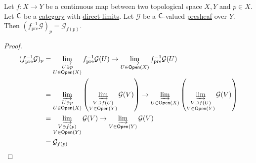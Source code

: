 \documentclass[../../../main]{subfiles}
\begin{document}
\begin{lemma}
  Let \(f: X \to Y\) be a continuous map between two topological space \(X, Y\) and \(p \in X\).
  Let \(\mathsf{C}\) be a \hyperref[def:category]{category} with \hyperref[def:direct-limit]{direct limits}.
  Let \(\mathcal{G}\) be a \(\mathsf{C}\)-valued \hyperref[def:presheaf]{presheaf} over \(Y\).
  Then \((f_{\operatorname{pre}}^{-1} \mathcal{G})_{p} = \mathcal{G}_{f(p)}\).
\end{lemma}
\begin{proof}
  \begin{align*}
    (f_{\operatorname{pre}}^{-1} \mathcal{G})_{p} &= \varinjlim_{\substack{U \ni p \\ U \in \mathsf{Open}(X)}} f_{\operatorname{pre}}^{-1}\mathcal{G}(U) \to \varinjlim_{U \in \mathsf{Open}(X)} f_{\operatorname{pre}}^{-1}\mathcal{G}(U) \\
                                        &= \varinjlim_{\substack{U \ni p \\ U \in \mathsf{Open}(X)}} \left( \varinjlim_{\substack{V \supseteq f(U) \\ V \in \mathsf{Open}(Y)}} \mathcal{G}(V) \right) \to \varinjlim_{U \in \mathsf{Open}(X)} \left( \varinjlim_{\substack{V \supseteq f(U) \\ V \in \mathsf{Open}(Y)}} \mathcal{G}(V) \right) \\
                                        &= \varinjlim_{\substack{V \ni f(p) \\ V \in \mathsf{Open}(Y)}} \mathcal{G}(V) \to \varinjlim_{V \in \mathsf{Open}(Y)} \mathcal{G}(V) \\
                                        &= \mathcal{G}_{f(p)}
  \end{align*}
\end{proof}
\end{document}
